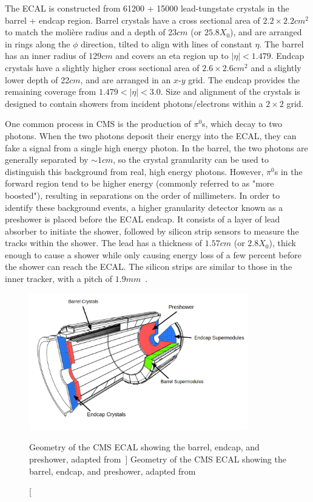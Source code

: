 The ECAL is constructed from 61200 + 15000 lead-tungstate crystals in the barrel + endcap region. Barrel crystals have a cross sectional area of $2.2\times2.2\unit{cm^2}$ to match the moli\`ere radius and a depth of 23$\unit{cm}$ (or $25.8 X_0$), and are arranged in rings along the $\phi$ direction, tilted to align with lines of constant $\eta$. The barrel has an inner radius of $129\unit{cm}$ and covers an eta region up to $\left|\eta\right|<1.479$. Endcap crystals have a slightly higher cross sectional area of $2.6\times2.6\unit{cm^2}$ and a slightly lower depth of 22$\unit{cm}$, and are arranged in an $x$-$y$ grid. The endcap provides the remaining coverage from $1.479<\left|\eta\right|<3.0$. Size and alignment of the crystals is designed to contain showers from incident photons/electrons within a $2\times2$ grid.

One common process in CMS is the production of $\pi^0$s, which decay to two photons. When the two photons deposit their energy into the ECAL, they can fake a signal from a single high energy photon. In the barrel, the two photons are generally separated by $\sim1\unit{cm}$, so the crystal granularity can be used to distinguish this background from real, high energy photons. However, $\pi^0$s in the forward region tend to be higher energy (commonly referred to as "more boosted"), resulting in separations on the order of millimeters. In order to identify these background events, a higher granularity detector known as a preshower is placed before the ECAL endcap. It consists of a layer of lead absorber to initiate the shower, followed by silicon strip sensors to measure the tracks within the shower. The lead has a thickness of $1.57\unit{cm}$ (or $2.8X_0$), thick enough to cause a shower while only causing energy loss of a few percent before the shower can reach the ECAL. The silicon strips are similar to those in the inner tracker, with a pitch of $1.9\unit{mm}$~\cite{TOURNEFIER2001355}.

\begin{figure}[htpb]
	\centering
	\includegraphics[width=0.85\textwidth]{figs/03_experiment/cms_ecal.pdf}
	\caption
	[Geometry of the CMS ECAL showing the barrel, endcap, and preshower, adapted from~\cite{Marzocchi2019}]
	{Geometry of the CMS ECAL showing the barrel, endcap, and preshower, adapted from~\cite{Marzocchi2019}}
	\label{fig:ecal}
\end{figure}


